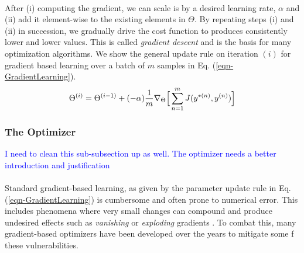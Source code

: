 \documentclass[12pt,letterpaper]{article}
\begin{document}
\paragraph*{}After (i) computing the gradient, we can scale is by a desired learning rate, $\alpha$ and (ii) add it element-wise to the existing elements in $\Theta$. By repeating steps (i) and (ii) in succession, we gradually drive the cost function to produces consistently lower and lower values. This is called \textit{gradient descent} and is the basis for many optimization algorithms. We show the general update rule on iteration $(i)$ for gradient based learning over a batch of $m$ samples in Eq. (\ref{eqn-GradientLearning}).
\begin{equation}
\label{eqn-GradientLearning}
\Theta^{(i)} = \Theta^{(i-1)} + (-\alpha)\frac{1}{m} \nabla_{\Theta} \Big[\sum_{n=1}^{m} J(y^{*(n)},y^{(n)}) \Big] \\
\end{equation}


\subsubsection{The Optimizer}

\textcolor{blue}{I need to clean this sub-subsection up as well. The optimizer needs a better introduction and justification}

\paragraph*{}Standard gradient-based learning, as given by the parameter update rule in Eq. (\ref{eqn-GradientLearning}) is cumbersome and often prone to numerical error. This includes phenomena where very small changes can compound and produce undesired effects such as \textit{vanishing} or \textit{exploding} gradients \cite{Geron,Goodfellow,Loy}. To combat this, many gradient-based optimizers have been developed over the years to mitigate some f these vulnerabilities.
\end{document}
